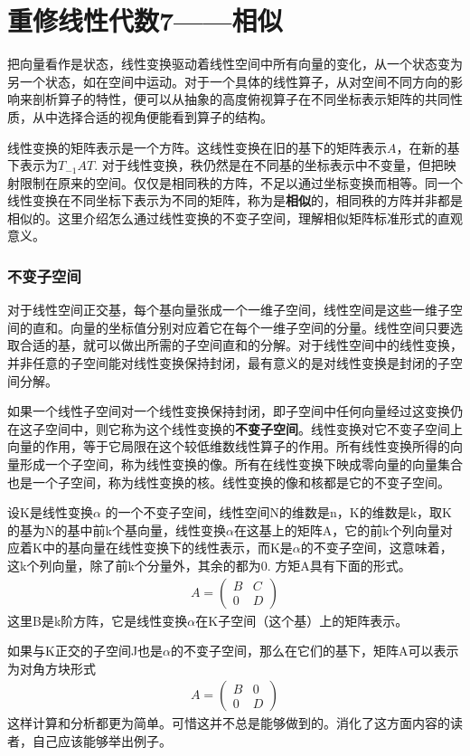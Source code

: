 \chapter{重修线性代数7——相似}
	把向量看作是状态，线性变换驱动着线性空间中所有向量的变化，从一个状态变为另一个状态，如在空间中运动。对于一个具体的线性算子，从对空间不同方向的影响来剖析算子的特性，便可以从抽象的高度俯视算子在不同坐标表示矩阵的共同性质，从中选择合适的视角便能看到算子的结构。
	
	线性变换的矩阵表示是一个方阵。这线性变换在旧的基下的矩阵表示$ A $，在新的基下表示为$ T_{-1}AT $. 对于线性变换，秩仍然是在不同基的坐标表示中不变量，但把映射限制在原来的空间。仅仅是相同秩的方阵，不足以通过坐标变换而相等。同一个线性变换在不同坐标下表示为不同的矩阵，称为是\textbf{相似}的，相同秩的方阵并非都是相似的。这里介绍怎么通过线性变换的不变子空间，理解相似矩阵标准形式的直观意义。
	
	\subsection{不变子空间}
	
	对于线性空间正交基，每个基向量张成一个一维子空间，线性空间是这些一维子空间的直和。向量的坐标值分别对应着它在每个一维子空间的分量。线性空间只要选取合适的基，就可以做出所需的子空间直和的分解。对于线性空间中的线性变换，并非任意的子空间能对线性变换保持封闭，最有意义的是对线性变换是封闭的子空间分解。
	
	如果一个线性子空间对一个线性变换保持封闭，即子空间中任何向量经过这变换仍在这子空间中，则它称为这个线性变换的\textbf{不变子空间}。线性变换对它不变子空间上向量的作用，等于它局限在这个较低维数线性算子的作用。所有线性变换所得的向量形成一个子空间，称为线性变换的像。所有在线性变换下映成零向量的向量集合也是一个子空间，称为线性变换的核。线性变换的像和核都是它的不变子空间。
	
	设K是线性变换$ \alpha $ 的一个不变子空间，线性空间N的维数是n，K的维数是k，取K的基为N的基中前k个基向量，线性变换$ \alpha $在这基上的矩阵A，它的前k个列向量对应着K中的基向量在线性变换下的线性表示，而K是$ \alpha $的不变子空间，这意味着，这k个列向量，除了前k个分量外，其余的都为0. 方矩A具有下面的形式。
	\begin{gather*}
		A = \begin{pmatrix} B & C\\0 & D\end{pmatrix}
	\end{gather*}
	这里B是k阶方阵，它是线性变换$ \alpha $在K子空间（这个基）上的矩阵表示。
	
	如果与K正交的子空间J也是$ \alpha $的不变子空间，那么在它们的基下，矩阵A可以表示为对角方块形式
	\begin{gather*}
	A = \begin{pmatrix} B & 0\\0 & D\end{pmatrix}
	\end{gather*}
	这样计算和分析都更为简单。可惜这并不总是能够做到的。消化了这方面内容的读者，自己应该能够举出例子。
	
